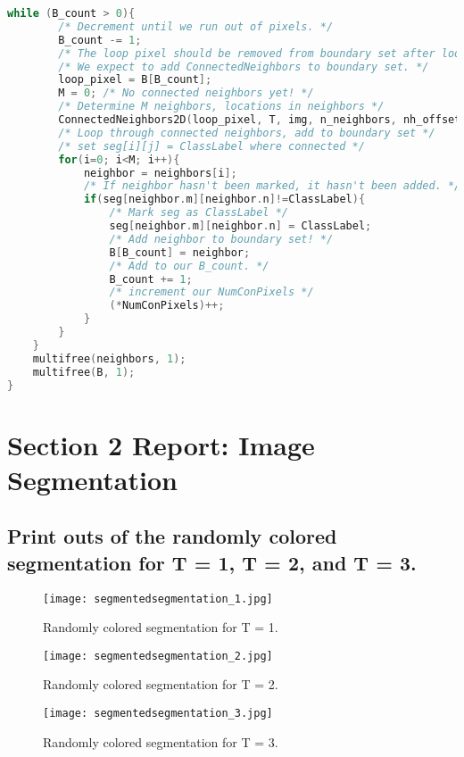 \documentclass{article}
\begin{document}
\begin{lstlisting}[language=C, caption=connected\_neighbors\_sets.c, label={lst:connsets}]
    while (B_count > 0){
        /* Decrement until we run out of pixels. */
        B_count -= 1;
        /* The loop pixel should be removed from boundary set after loop. */
        /* We expect to add ConnectedNeighbors to boundary set. */
        loop_pixel = B[B_count];
        M = 0; /* No connected neighbors yet! */
        /* Determine M neighbors, locations in neighbors */
        ConnectedNeighbors2D(loop_pixel, T, img, n_neighbors, nh_offsets, width, height, &M, neighbors);
        /* Loop through connected neighbors, add to boundary set */
        /* set seg[i][j] = ClassLabel where connected */
        for(i=0; i<M; i++){
            neighbor = neighbors[i];
            /* If neighbor hasn't been marked, it hasn't been added. */
            if(seg[neighbor.m][neighbor.n]!=ClassLabel){
                /* Mark seg as ClassLabel */
                seg[neighbor.m][neighbor.n] = ClassLabel;
                /* Add neighbor to boundary set! */
                B[B_count] = neighbor;
                /* Add to our B_count. */
                B_count += 1;
                /* increment our NumConPixels */
                (*NumConPixels)++;
            }
        }
    }
    multifree(neighbors, 1);
    multifree(B, 1);
}
\end{lstlisting}
\newpage
\section{Section 2 Report: Image Segmentation}
\subsection{Print outs of the randomly colored segmentation for T = 1, T = 2, and T = 3.}
\begin{figure}[h]
    \centering
    \texttt{[image: segmentedsegmentation\_1.jpg]}
    \caption{Randomly colored segmentation for T = 1.}
    \label{fig:5}
\end{figure}
\newpage
\begin{figure}[h]
    \centering
    \texttt{[image: segmentedsegmentation\_2.jpg]}
    \caption{Randomly colored segmentation for T = 2.}
    \label{fig:6}
\end{figure}
\newpage
\begin{figure}[h]
    \centering
    \texttt{[image: segmentedsegmentation\_3.jpg]}
    \caption{Randomly colored segmentation for T = 3.}
    \label{fig:7}
\end{figure}
\newpage
\end{document}
